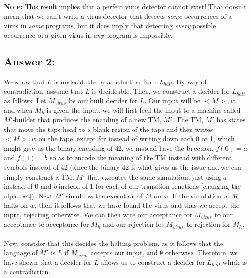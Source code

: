 \documentclass[12pt]{article}
\begin{document}
\textbf{Note:}  This result implies that a perfect virus detector cannot exist! That doesn't mean that we can't write a virus detector that detects \emph{some} occurrences of a virus in \emph{some} programs, but it does imply that detecting \emph{every} possible occurrence of a given virus  in \emph{any} program is impossible.

\subsection*{Answer 2:}
We show that $L$ is undecidable by a reduction from $L_{halt}$. By way of contradiction, assume that $L$ is decideable. Then, we construct a decider for $L_{halt}$ as follows: Let $M_{virus}$ be our built decider for $L$. Our input will be $<M>, w$ and when $M_h$ is given the input, we will first feed the input to a machine called $M'$-builder that produces the encoding of a new TM, $M'$. The TM, $M'$ has states that move the tape head to a blank region of the tape and then writes $<M>, w$ on the tape, except for instead of writing down each 0 or 1, which might give us the binary encoding of 42, we instead have the bijection, $f(0) = a$ and $f(1) = b$ so as to encode the meaning of the TM instead with different symbols instead of 42 (since the binary 42 is what gives us the issue and we can simply construct a TM, $M'$ that executes the same simulation, just using $a$ instead of 0 and $b$ instead of 1 for each of our transition functions [changing the alphabet]). Next $M'$ simulates the execution of $M$ on $w$. If the simulation of $M$ halts on $w$, then it follows that we have found the virus and thus we accept the input, rejecting otherwise.
We can then wire our acceptance for $M_{virus}$ to our acceptance to acceptance for $M_h$ and our rejection for $M_{virus}$ to rejection for $M_h$. \\\\
Now, consider that this decides the halting problem, as it follows that the language of $M'$ is $L$ if $M_{virus}$ accepts our input, and $\emptyset$ otherwise. Therefore, we have shown that a decider for $L$ allows us to construct a decider for $L_{halt}$ which is a contradiction.
\end{document}
